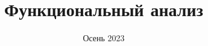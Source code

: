 \documentclass[12pt, a4paper, oneside]{memoir}
\title{Функциональный анализ}
\date{Осень 2023}
\begin{document}
\begin{titlingpage}
    \maketitle
\end{titlingpage}


\tableofcontents










\end{document}

